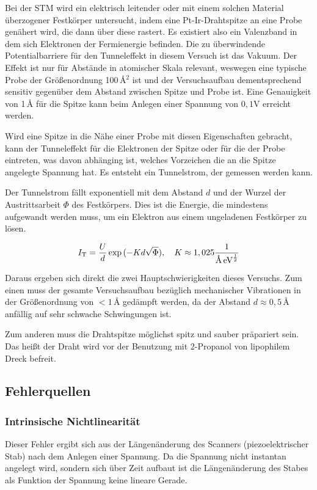 \noindent Bei der STM wird ein elektrisch leitender oder mit einem solchen Material überzogener Festkörper untersucht, indem eine Pt-Ir-Drahtspitze an eine Probe genähert wird, die dann über diese rastert. Es existiert also ein Valenzband in dem sich Elektronen der Fermienergie befinden. Die zu überwindende Potentialbarriere für den Tunneleffekt in diesem Versuch ist das Vakuum. Der Effekt ist nur für Abstände in atomischer Skala relevant, weswegen eine typische Probe der Größenordnung 100\,\r{A}\(^2\) ist und der Versuchsaufbau dementsprechend sensitiv gegenüber dem Abstand zwischen Spitze und Probe ist. Eine Genauigkeit von 1\,\r{A} für die Spitze kann beim Anlegen einer Spannung von \(0,1\)V erreicht werden.

\noindent Wird eine Spitze in die Nähe einer Probe mit diesen Eigenschaften gebracht, kann der Tunneleffekt für die Elektronen der Spitze oder für die der Probe eintreten, was davon abhänging ist, welches Vorzeichen die an die Spitze angelegte Spannung hat. Es entsteht ein Tunnelstrom, der gemessen werden kann.

\noindent Der Tunnelstrom fällt exponentiell mit dem Abstand \(d\) und der Wurzel der Austrittsarbeit \(\Phi\) des Festkörpers. Dies ist die Energie, die mindestens aufgewandt werden muss, um ein Elektron aus einem ungeladenen Festkörper zu lösen. 

\begin{equation}
I_\text{T}=\frac{U}{d}\exp{(-Kd\sqrt{\Phi})},\quad K\approx1,025\frac{1}{\text{\r{A}}\,\text{eV}^\frac12}
\end{equation}

\noindent Daraus ergeben sich direkt die zwei Hauptschwierigkeiten dieses Versuchs. Zum einen muss der gesamte Versuchsaufbau bezüglich mechanischer Vibrationen in der Größenordnung von \(<1\)\,\r{A} gedämpft werden, da der Abstand \(d\approx0,5\)\,\r{A} anfällig auf sehr schwache Schwingungen ist.  

\noindent Zum anderen muss die Drahtspitze möglichst spitz und sauber präpariert sein. Das heißt der Draht wird vor der Benutzung mit 2-Propanol von lipophilem Dreck befreit.

\subsection{Fehlerquellen}
\subsubsection{Intrinsische Nichtlinearität}
Dieser Fehler ergibt sich aus der Längenänderung des Scanners (piezoelektrischer Stab) nach dem Anlegen einer Spannung. Da die Spannung nicht instantan angelegt wird, sondern sich über Zeit aufbaut ist die Längenänderung des Stabes als Funktion der Spannung keine lineare Gerade.

